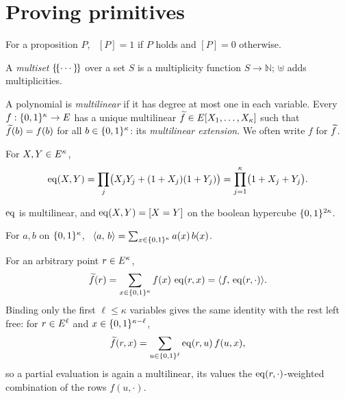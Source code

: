\section{Proving primitives}\label{sec:prelim}

\begin{definition}\label{def:iverson}
For a proposition $P$, \ $[P]=1$ if $P$ holds and $[P]=0$ otherwise.
\end{definition}

\begin{definition}[Multiset]\label{def:multiset}
A \emph{multiset} $\{\!\{\cdots\}\!\}$ over a set $S$ is a multiplicity function $S\to\mathbb{N}$; $\uplus$ adds multiplicities.
\end{definition}

\begin{definition}\label{def:mle}
A polynomial is \emph{multilinear} if it has degree at most one in each variable. Every $f:\{0,1\}^{\kappa}\to E$ has a unique multilinear $\widetilde{f}\in E[X_1,\dots,X_\kappa]$ such that $\widetilde{f}(b)=f(b)$ for all $b\in\{0,1\}^{\kappa}$: its \emph{multilinear extension}. We often write $f$ for $\widetilde{f}$.
\end{definition}


\begin{definition}\label{def:eq}
For $X,Y\in E^{\kappa}$,
\[
  \operatorname{eq}(X,Y)= \prod_j\bigl(X_jY_j+(1+X_j)(1+Y_j)\bigr) = \prod_{j=1}^{\kappa}\bigl(1+X_j+Y_j\bigr).
\]
\end{definition}

$\operatorname{eq}$ is multilinear, and $\operatorname{eq}(X,Y)=[X=Y]$ on the boolean hypercube $\{0,1\}^{2\kappa}$.

\begin{definition}\label{def:inner}
For $a,b$ on $\{0,1\}^{\kappa}$, \ $\langle a,\, b \rangle=\sum_{x\in\{0,1\}^{\kappa}}a(x)\,b(x)$.
\end{definition}

\begin{fact}\label{fact:eq}
For an arbitrary point $r\in E^{\kappa}$,
\[
  \widetilde{f}(r)=\sum_{x\in\{0,1\}^{\kappa}}f(x)\,\operatorname{eq}(r,x)=\langle f,\, \operatorname{eq}(r,\cdot) \rangle.
\]
Binding only the first $\ell\le\kappa$ variables gives the same identity with the rest left free: for $r\in E^{\ell}$ and $x\in\{0,1\}^{\kappa-\ell}$,
\[
  \widetilde{f}(r,x)=\sum_{u\in\{0,1\}^{\ell}}\operatorname{eq}(r,u)\,f(u,x),
\]
so a partial evaluation is again a multilinear, its values the $\operatorname{eq}(r,\cdot)$-weighted combination of the rows $f(u,\cdot)$.
\end{fact}

